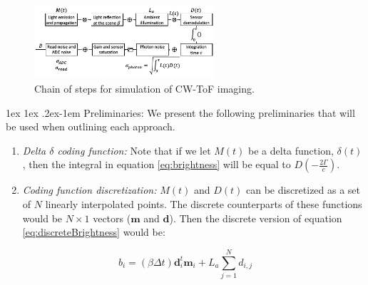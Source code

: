 \documentclass[12pt]{article}
\makeatletter
\def \m {\mathbf{m}}
\def \d {\mathbf{d}}
\def \f {\mathbf{f}}
\renewcommand{\paragraph}{%
  \@startsection{paragraph}{4}%
  {\z@}{1ex \@plus 1ex \@minus .2ex}{-1em}%
  {\normalfont\normalsize\bfseries}%
}
\makeatother
\begin{document}
\begin{figure}[h]
\centerline{%
\includegraphics[width=0.6\textwidth]{"../Figures/tofSimulation"}%
}
\caption{Chain of steps for simulation of CW-ToF imaging.}
\label{fig:tofSimulation}
\end{figure}

\paragraph{Preliminaries: }We present the following preliminaries that will be used when outlining each approach.
\begin{enumerate}
	\item{\textit{Delta $\delta$ coding function:} } Note that if we let $M(t)$ be a delta function, $\delta(t)$, then the integral in equation \ref{eq:brightness} will be equal to $D(-\frac{2\Gamma}{c})$.
	\item{\textit{Coding function discretization:}} $M(t)$ and $D(t)$ can be discretized as a set of $N$ linearly interpolated points. The discrete counterparts of these functions would be $N \times 1$ vectors ($\m$ and $\d$). %
	Then the discrete version of equation \ref{eq:discreteBrightness} would be:
\end{enumerate}



\begin{equation} \label{eq:discreteBrightness}
    b_{i} = (\beta \Delta t)\d_{i}^{t}\m_{i}  + L_a \sum_{j=1}^{N} d_{i,j}
\end{equation}
\end{document}
